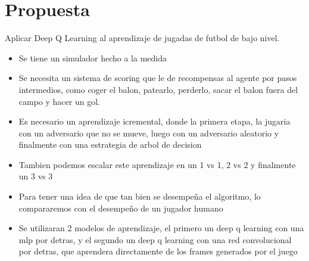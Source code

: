 \chapter{Propuesta}

Aplicar Deep Q Learning al aprendizaje de jugadas de futbol de bajo nivel.

\begin{itemize}
\item Se tiene un simulador hecho a la medida
\item Se necesita un sistema de scoring que le de recompensas al agente por pasos intermedios, como coger el balon, patearlo, perderlo, sacar el balon fuera del campo y hacer un gol.
\item Es necesario un aprendizaje icremental, donde la primera etapa, la jugaria con un adversario que no se mueve, luego con un adversario aleatorio y finalmente con una estrategia de arbol de decision
\item Tambien podemos escalar este aprendizaje en un 1 vs 1, 2 vs 2 y finalmente un 3 vs 3
\item Para tener una idea de que tan bien se desempeña el algoritmo, lo compararemos con el desempeño de un jugador humano
\item Se utilizaran 2 modelos de aprendizaje, el primero un deep q learning con una mlp por detras, y el segundo un deep q learning con una red convolucional por detras, que aprendera directamente de los frames generados por el juego
\end{itemize}
